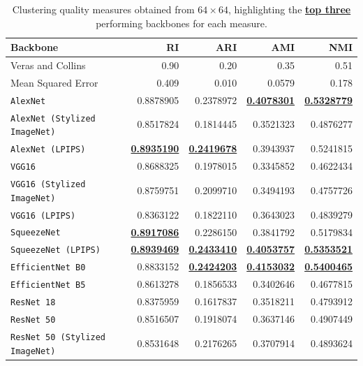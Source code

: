 \documentclass[sigconf]{acmart}
\begin{document}
\begin{table}[!htbp]
  \caption{Clustering quality measures obtained from $64 \times 64$, highlighting the \textbf{\underline{top three}} performing backbones for each measure.}
  \label{tab:freq}
    \begin{tabular}{lrrrr}
    \toprule
    Backbone & RI & ARI & AMI & NMI\\
    \midrule
    Veras and Collins & 0.90 & 0.20 & 0.35 & 0.51 \\ 
    Mean Squared Error & 0.409 & 0.010 & 0.0579 & 0.178 \\ 
    \addlinespace
    \texttt{AlexNet} & 0.8878905 & 0.2378972 & \textbf{\underline{0.4078301}} & \textbf{\underline{0.5328779}}\\
    \texttt{AlexNet (Stylized ImageNet)} & 0.8517824 & 0.1814445 & 0.3521323 & 0.4876277\\
    \texttt{AlexNet (LPIPS)} & \textbf{\underline{0.8935190}} & \textbf{\underline{0.2419678}} & 0.3943937 & 0.5241815\\
    \addlinespace
    \texttt{VGG16} & 0.8688325 & 0.1978015 & 0.3345852 & 0.4622434\\
    \texttt{VGG16 (Stylized ImageNet)} & 0.8759751 & 0.2099710 & 0.3494193 & 0.4757726\\ 
    \texttt{VGG16 (LPIPS)} & 0.8363122 & 0.1822110 & 0.3643023 & 0.4839279\\
    \addlinespace
    \texttt{SqueezeNet} & \textbf{\underline{0.8917086}} & 0.2286150 & 0.3841792 & 0.5179834\\
    \texttt{SqueezeNet (LPIPS)} & \textbf{\underline{0.8939469}} & \textbf{\underline{0.2433410}} & \textbf{\underline{0.4053757}} & \textbf{\underline{0.5353521}}\\
    \addlinespace
    \texttt{EfficientNet B0} & 0.8833152 & \textbf{\underline{0.2424203}} & \textbf{\underline{0.4153032}} & \textbf{\underline{0.5400465}}\\
    \texttt{EfficientNet B5} & 0.8613278 & 0.1856533 & 0.3402646 & 0.4677815\\
    \addlinespace
    \texttt{ResNet 18} & 0.8375959 & 0.1617837 & 0.3518211 & 0.4793912\\
    \texttt{ResNet 50} & 0.8516507 & 0.1918074 & 0.3637146 & 0.4907449\\
    \texttt{ResNet 50 (Stylized ImageNet)} & 0.8531648 & 0.2176265 & 0.3707914 & 0.4893624\\
    \bottomrule
    \end{tabular}
\end{table}
\end{document}
